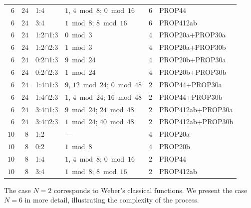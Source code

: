 \documentclass[12pt,twoside,leqno]{article}
\numberwithin{equation}{section}
\begin{document}
\begin{center}
\begin{tabular}{|@{}r|r@{\,}||l|l@{\,}||r@{\,}||l@{}|}
 $6$       & $24$ & 1:4          & $1$, $4\bmod8$; $0\bmod16$     &  $6$ & PROP44  \\
 $6$       & $24$ & 3:4          & $1\bmod8$; $8\bmod16$          &  $6$ & PROP412ab \\
 $6$       & $24$ & 1:2$\cap$1:3 & $0\bmod3$                      &  $4$ & PROP20a+PROP30a\\
 $6$       & $24$ & 1:2$\cap$2:3 & $1\bmod3$                      &  $4$ & PROP20a+PROP30b\\
 $6$       & $24$ & 0:2$\cap$1:3 & $9 \bmod 24$                   &  $4$ & PROP20b+PROP30a\\
 $6$       & $24$ & 0:2$\cap$2:3 & $1 \bmod 24$                   &  $4$ & PROP20b+PROP30b\\
 $6$       & $24$ & 1:4$\cap$1:3 & $9$, $12\bmod24$; $0\bmod48$   &  $2$ & PROP44+PROP30a\\
 $6$       & $24$ & 1:4$\cap$2:3 & $1$, $4\bmod24$; $16\bmod48$   &  $2$ & PROP44+PROP30b\\
 $6$       & $24$ & 3:4$\cap$1:3 & $9\bmod24$; $24\bmod48$        &  $2$ & PROP412ab+PROP30a\\
 $6$       & $24$ & 3:4$\cap$2:3 & $1\bmod24$; $40\bmod48$        &  $2$ & PROP412ab+PROP30b\\
\hline
$10$       &  $8$ & 1:2          & ---                            &  $4$ & PROP20a \\
$10$       &  $8$ & 0:2          & $1 \bmod 8$                    &  $4$ & PROP20b \\
$10$       &  $8$ & 1:4          & $1$, $4\bmod8$; $0\bmod16$     &  $2$ & PROP44  \\
$10$       &  $8$ & 3:4          & $1\bmod8$; $8\bmod16$          &  $2$ & PROP412ab \\
\hline
\end{tabular}
\end{center}

The case $N=2$ corresponds to Weber's classical functions. We present the
case $N=6$ in more detail, illustrating the complexity of the process.
\end{document}
